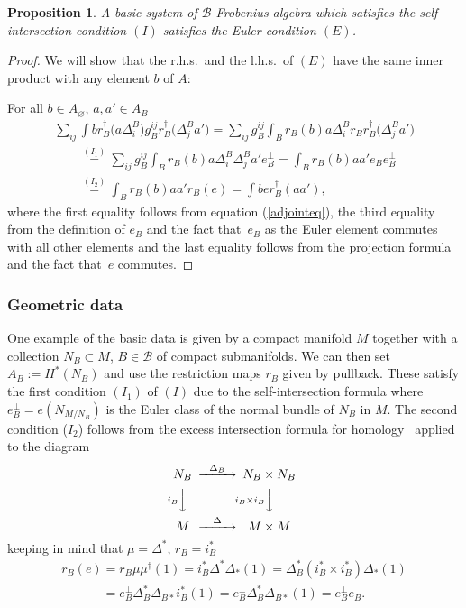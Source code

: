\documentclass[11pt]{article}
\newtheorem{prop}[thm]{Proposition}
\def\calB{{\mathcal B}}
\def\res{r}
\begin{document}
\begin{prop}A  basic system of  $\calB$ Frobenius algebra which satisfies the self-intersection condition $(I)$ satisfies the Euler condition $(E)$.
\end{prop}

\begin{proof} We will show that the r.h.s.\ and the l.h.s.\ of $(E)$ have
the same inner product with any element $b$ of $A$:

For all $b\in A_{\varnothing}$, $a, a'\in A_B$
\begin{gather*} \sum_{ij} \int b  \res_B^{\dagger}\big(a\Delta^{B}_i\big)
g_{B}^{ij}  \res_B^{\dagger}\big(\Delta^{B}_j a'\big)
 = \sum_{ij}g_{B}^{ij}
 \int_B \res_{B}(b)a\Delta^{B}_i
 \res_{B}\res_B^{\dagger}\big(\Delta^{B}_ja'\big) \\
\qquad{}  \stackrel{(I_1)}{=} \sum_{ij}g_{B}^{ij}
 \int_B \res_{B}(b)a\Delta^{B}_i \Delta^{B}_j
 a'e_{B}^{\perp}
 =
 \int_B \res_{B}(b)aa' e_B e_B^{\perp}\\
\qquad{} \stackrel{(I_2)}{=} \int_B \res_{B}(b)aa'\res_B(e)
 = \int b  e\res_B^{\dagger}(aa'),
\end{gather*}
where the f\/irst   equality follows from equation (\ref{adjointeq}),
the third equality from the def\/inition of $e_B$ and the fact that~$e_B$ as the Euler element commutes with all other elements and the
last equality follows from the projection formula and the fact that~$e$ commutes.
\end{proof}



\subsubsection{Geometric data}
\label{geodatasection} One example of the basic data is given by a
compact manifold $M$ together with a collection $N_B\subset M$, $B\in
\calB$ of compact submanifolds. We can then set $A_B:=H^*(N_B)$ and
use the restriction maps $r_B$     given by pullback. These satisfy
the f\/irst  condition $(I_1)$ of $(I)$ due to the self-intersection
formula where $e_B^{\perp}=e(N_{M/N_B})$ is the Euler class of the
normal bundle of $N_B$ in $M$. The second condition ($I_2$) follows
from the excess intersection formula for homology~\cite{Qu} applied
to the diagram
\begin{equation}
\label{intdiagram}
\begin{CD}
N_B @>\Delta_B>>N_B \times N_B \\
@Vi_BVV @V i_B\times i_B VV\\
M@>\Delta>> M\times M
\end{CD}
\end{equation}
keeping in mind that $\mu=\Delta^{*}$, $\res_B=i_B^*$
\begin{gather*}
\res_B(e)=\res_B\mu\mu^{\dagger}(1)=i_B^*\Delta^*\Delta_*(1)=\Delta^*_B(i_{B}^*\times i_{B}^*)\Delta_*(1) \\
\phantom{\res_B(e)}{} =e_B^{\perp}\Delta_B^*\Delta_{B*}i_B^*(1)=e_B^{\perp}\Delta_B^*\Delta_{B*}(1)=
e^{\perp}_Be_B.
\end{gather*}
\end{document}
